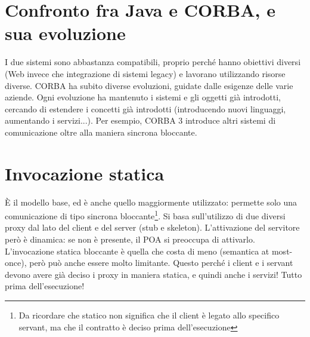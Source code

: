 \section{Confronto fra Java e CORBA, e sua evoluzione}
I due sistemi sono abbastanza compatibili, proprio perché hanno obiettivi diversi (Web invece che integrazione di
sistemi legacy) e lavorano utilizzando risorse diverse.
CORBA ha subito diverse evoluzioni, guidate dalle esigenze delle varie aziende.
Ogni evoluzione ha mantenuto i sistemi e gli oggetti già introdotti, cercando di estendere i concetti già introdotti
(introducendo nuovi linguaggi, aumentando i servizi...). Per esempio, CORBA 3 introduce altri sistemi di
comunicazione oltre alla maniera sincrona bloccante.
\section{Invocazione statica}
È il modello base, ed è anche quello maggiormente utilizzato: permette solo una comunicazione di tipo sincrona
bloccante\footnote{Da ricordare che statico non significa che il client è legato allo specifico servant, ma che il
contratto è deciso prima dell'esecuzione}. Si basa sull'utilizzo di due diversi proxy dal lato del client e del server
(stub e skeleton). L'attivazione del servitore però è dinamica: se non è presente, il POA si preoccupa di attivarlo.
L'invocazione statica bloccante è quella che costa di meno (semantica at most-once), però può anche essere molto
limitante. Questo perché i client e i servant devono avere già deciso i proxy in maniera statica, e quindi anche i
servizi! Tutto prima dell'esecuzione!
